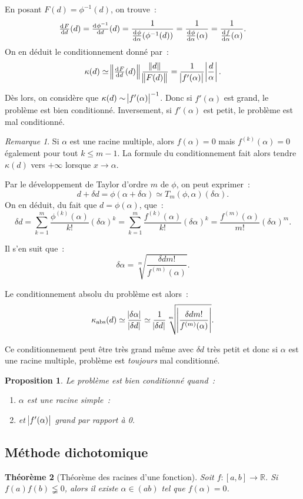 \documentclass{article}
\newtheorem{thm}{Théorème}[section]
\newtheorem{prp}[thm]{Proposition}
\theoremstyle{definition}
\theoremstyle{remark}
\newtheorem*{rmq}{Remarque}
\newcommand{\R}{\mathbb R}
\begin{document}
		En posant $F(d) = \phi^{-1}(d)$, on trouve~:
		\[\od Fd(d) = \od {\phi^{-1}}d(d) = \frac 1{\od \phi \alpha(\phi^{-1}(d))} = \frac 1{\od \phi\alpha(\alpha)} = \frac 1{\od f\alpha(\alpha)}.\]
		On en déduit le conditionnement donné par~:
		\[\kappa(d) \simeq \norm {\od Fd(d)}\frac {\norm d}{\norm {F(d)}} = \frac 1{\abs {f'(\alpha)}} \abs {\frac d\alpha}.\]

		Dès lors, on considère que $\kappa(d) \sim \abs{f'(\alpha)}^{-1}$. Donc si $f'(\alpha)$ est grand, le problème est bien conditionné. Inversement, si
		$f'(\alpha)$ est petit, le problème est mal conditionné.

		\begin{rmq} Si $\alpha$ est une racine multiple, alors $f(\alpha) = 0$ mais $f^{(k)}(\alpha) = 0$ également pour tout $k \leq m-1$. La formule du
		conditionnement fait alors tendre $\kappa(d)$ vers $+\infty$ lorsque $x \to \alpha$.
		\end{rmq}

		Par le développement de Taylor d'ordre $m$ de $\phi$, on peut exprimer~:
		\[d+\delta d = \phi(\alpha + \delta\alpha) \simeq T_m(\phi, \alpha)(\delta\alpha).\]
		On en déduit, du fait que $d = \phi(\alpha)$, que~:
		\[\delta d = \sum_{k=1}^m\frac {\phi^{(k)}(\alpha)}{k!}(\delta\alpha)^k = \sum_{k=1}^m\frac {f^{(k)}(\alpha)}{k!}(\delta \alpha)^k
		= \frac {f^{(m)}(\alpha)}{m!}(\delta\alpha)^m.\]

		Il s'en suit que~:
		\[\delta\alpha = \sqrt[m] {\frac {\delta dm!}{f^{(m)}(\alpha)}}.\]

		Le conditionnement absolu du problème est alors~:
		\[\kappa_{\text{abs}}(d) \simeq \frac {\abs {\delta \alpha}}{\abs {\delta d}}
		\simeq \frac 1{\abs {\delta d}} \sqrt[m] {\abs {\frac {\delta dm!}{f^{(m)}(\alpha)}}}.\]

		Ce conditionnement peut être très grand même avec $\delta d$ très petit et donc si $\alpha$ est une racine multiple, problème est \emph{toujours} mal
		conditionné.

		\begin{prp} Le problème est bien conditionné quand~:
		\begin{enumerate}
			\item $\alpha$ est une racine simple~:
			\item et $\abs {f'(\alpha)}$ grand par rapport à 0.
		\end{enumerate}
		\end{prp}

	\subsection{Méthode dichotomique}
		\begin{thm}[Théorème des racines d'une fonction] Soit $f : [a, b]\to \R$. Si $f(a)f(b) \lneqq 0$, alors il existe $\alpha \in (ab)$ tel que
		$f(\alpha) = 0$.
		\end{thm}
\end{document}
